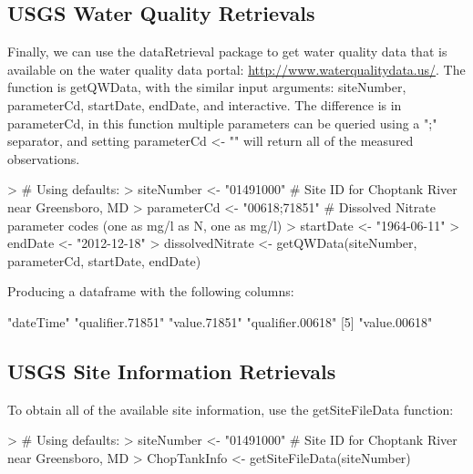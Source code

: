 \documentclass[a4paper,11pt]{article}
\begin{document}
\subsection{USGS Water Quality Retrievals}
Finally, we can use the dataRetrieval package to get water quality data that is available on the water quality data portal: \url{http://www.waterqualitydata.us/}. The function is getQWData, with the similar input arguments: siteNumber, parameterCd, startDate, endDate, and interactive. The difference is in parameterCd, in this function multiple parameters can be queried using a ";" separator, and setting parameterCd <- "" will return all of the measured observations.

\begin{Schunk}
\begin{Sinput}
> # Using defaults:
> siteNumber <- "01491000" # Site ID for Choptank River near Greensboro, MD
> parameterCd <- "00618;71851"  # Dissolved Nitrate parameter codes (one as mg/l as N, one as mg/l)
> startDate <- "1964-06-11"
> endDate <- "2012-12-18"
> dissolvedNitrate <- getQWData(siteNumber, parameterCd, startDate, endDate)
\end{Sinput}
\end{Schunk}

Producing a dataframe with the following columns:
\begin{Schunk}
\begin{Soutput}
[1] "dateTime"        "qualifier.71851" "value.71851"     "qualifier.00618"
[5] "value.00618"    
\end{Soutput}
\end{Schunk}


\subsection{USGS Site Information Retrievals}
To obtain all of the available site information, use the getSiteFileData function:
\begin{Schunk}
\begin{Sinput}
> # Using defaults:
> siteNumber <- "01491000" # Site ID for Choptank River near Greensboro, MD
> ChopTankInfo <- getSiteFileData(siteNumber)
\end{Sinput}
\end{Schunk}
\end{document}
